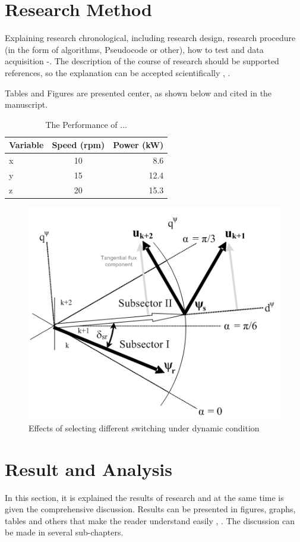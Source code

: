 \documentclass{iaesarticle3ol}
\begin{document}
\section{Research Method}
\label{}
Explaining research chronological, including research design, research procedure (in the form of algorithms, Pseudocode or other), how to test and data acquisition \cite{Li}-\cite{Zhang}. The description of the course of research should be supported references, so the explanation can be accepted scientifically \cite{Arulmozhiyal}, \cite{Yinhai}.
\par
Tables and Figures are presented center, as shown below and cited in the manuscript.\\

\begin{table}[h]
\caption{The Performance of ...}
\centering
\begin{tabular}{lcr}
\hline
Variable & Speed (rpm) & Power (kW) \\
\hline
x & 10 & 8.6 \\
y & 15 & 12.4 \\
z & 20 & 15.3 \\
\hline
\end{tabular}
\end{table}

\begin{figure}[h]
\centering
\includegraphics[scale=0.5]{figure1}
\caption{Effects of selecting different switching under dynamic condition}
\end{figure}

\section{Result and Analysis}
\label{}
In this section, it is explained the results of research and at the same time is given the comprehensive discussion. Results can be presented in figures, graphs, tables and others that make the reader understand easily \cite{Arulmozhiyal}, \cite{lamport}. The discussion can be made in several sub-chapters.
\end{document}
